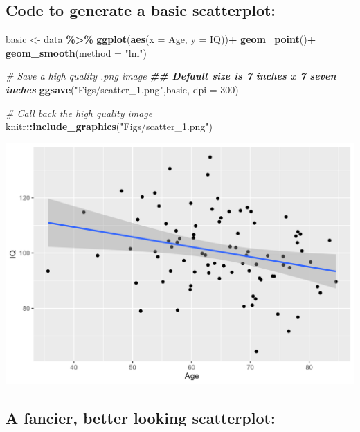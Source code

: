 \documentclass[
]{book}
\newenvironment{Shaded}{\begin{snugshade}}{\end{snugshade}}
\newcommand{\AttributeTok}[1]{\textcolor[rgb]{0.13,0.29,0.53}{#1}}
\newcommand{\CommentTok}[1]{\textcolor[rgb]{0.56,0.35,0.01}{\textit{#1}}}
\newcommand{\DecValTok}[1]{\textcolor[rgb]{0.00,0.00,0.81}{#1}}
\newcommand{\DocumentationTok}[1]{\textcolor[rgb]{0.56,0.35,0.01}{\textbf{\textit{#1}}}}
\newcommand{\FunctionTok}[1]{\textcolor[rgb]{0.13,0.29,0.53}{\textbf{#1}}}
\newcommand{\NormalTok}[1]{#1}
\newcommand{\OtherTok}[1]{\textcolor[rgb]{0.56,0.35,0.01}{#1}}
\newcommand{\SpecialCharTok}[1]{\textcolor[rgb]{0.81,0.36,0.00}{\textbf{#1}}}
\newcommand{\StringTok}[1]{\textcolor[rgb]{0.31,0.60,0.02}{#1}}
\begin{document}
\subsection*{Code to generate a basic scatterplot:}\label{code-to-generate-a-basic-scatterplot}

\begin{Shaded}
\begin{Highlighting}[]
\NormalTok{basic }\OtherTok{\textless{}{-}}\NormalTok{ data }\SpecialCharTok{\%\textgreater{}\%}
  \FunctionTok{ggplot}\NormalTok{(}\FunctionTok{aes}\NormalTok{(}\AttributeTok{x =}\NormalTok{ Age, }\AttributeTok{y =}\NormalTok{ IQ))}\SpecialCharTok{+}
  \FunctionTok{geom\_point}\NormalTok{()}\SpecialCharTok{+}
  \FunctionTok{geom\_smooth}\NormalTok{(}\AttributeTok{method =} \StringTok{"lm"}\NormalTok{)}

\CommentTok{\# Save a high quality .png image}
\DocumentationTok{\#\# Default size is 7 inches x 7 seven inches}
\FunctionTok{ggsave}\NormalTok{(}\StringTok{"Figs/scatter\_1.png"}\NormalTok{,basic, }\AttributeTok{dpi =} \DecValTok{300}\NormalTok{)}

\CommentTok{\# Call back the high quality image }
\NormalTok{knitr}\SpecialCharTok{::}\FunctionTok{include\_graphics}\NormalTok{(}\StringTok{"Figs/scatter\_1.png"}\NormalTok{)}
\end{Highlighting}
\end{Shaded}

\includegraphics[width=27.08in]{Figs/scatter_1}

\subsection*{A fancier, better looking scatterplot:}\label{a-fancier-better-looking-scatterplot}
\end{document}
